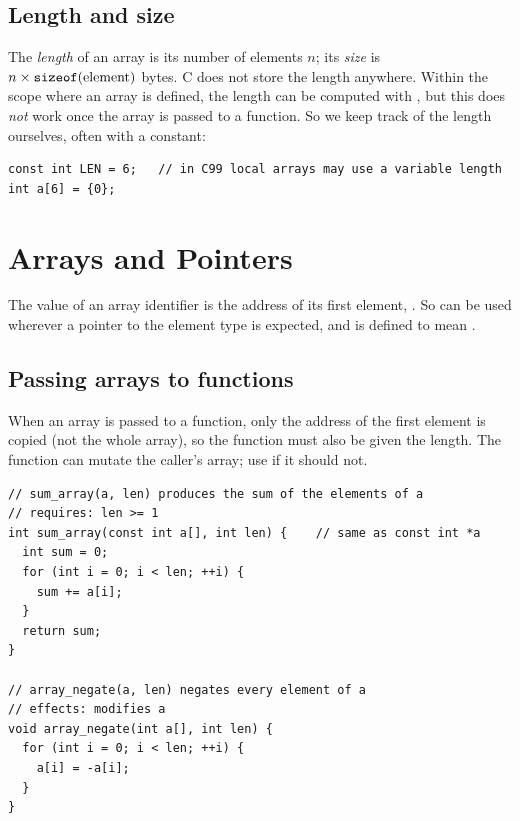 \subsection{Length and size}

The \emph{length} of an array is its number of elements $n$; its \emph{size} is
$n \times \texttt{sizeof}(\text{element})$ bytes. C does not store the length anywhere. Within the
scope where an array is defined, the length can be computed with
, but this does \emph{not} work once the array is passed to a
function. So we keep track of the length ourselves, often with a constant:
\begin{lstlisting}[style=c]
const int LEN = 6;   // in C99 local arrays may use a variable length
int a[6] = {0};
\end{lstlisting}

\section{Arrays and Pointers}

\begin{important}
The value of an array identifier  is the address of its first element, .
So  can be used wherever a pointer to the element type is expected, and
 is defined to mean .
\end{important}

\subsection{Passing arrays to functions}

When an array is passed to a function, only the address of the first element is copied (not the
whole array), so the function must also be given the length. The function can mutate the
caller's array; use  if it should not.
\begin{lstlisting}[style=c]
// sum_array(a, len) produces the sum of the elements of a
// requires: len >= 1
int sum_array(const int a[], int len) {    // same as const int *a
  int sum = 0;
  for (int i = 0; i < len; ++i) {
    sum += a[i];
  }
  return sum;
}

// array_negate(a, len) negates every element of a
// effects: modifies a
void array_negate(int a[], int len) {
  for (int i = 0; i < len; ++i) {
    a[i] = -a[i];
  }
}
\end{lstlisting}

